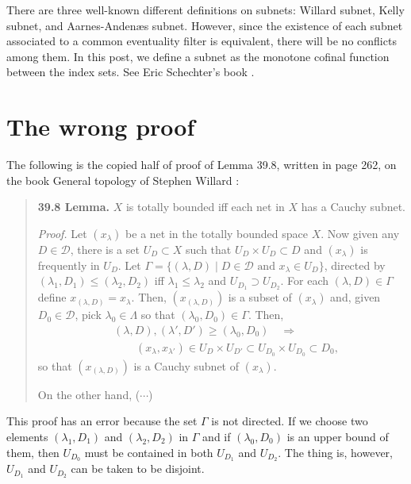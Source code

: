 \documentclass[11pt]{amsart}
\begin{document}
\begin{rmk}
There are three well-known different definitions on subnets: Willard subnet, Kelly subnet, and Aarnes-Andenæs subnet.
However, since the existence of each subnet associated to a common eventuality filter is equivalent, there will be no conflicts among them.
In this post, we define a subnet as the monotone cofinal function between the index sets.
See Eric Schechter's book \cite{schechter1996handbook}.
\end{rmk}

\section{The wrong proof}
The following is the copied half of proof of Lemma 39.8, written in page 262, on the book General topology of Stephen Willard \cite{willard2012general}:

\begin{quote}
\textbf{39.8 Lemma.}
$X$ is totally bounded iff each net in $X$ has a Cauchy subnet.

\textit{Proof.}
Let $(x_\lambda)$ be a net in the totally bounded space $X$.
Now given any $D\in\mathcal{D}$, there is a set $U_D\subset X$ such that $U_D\times U_D\subset D$ and $(x_\lambda)$ is frequently in $U_D$.
Let $\Gamma=\{(\lambda,D)\mid D\in\mathcal{D}\text{ and }x_\lambda\in U_D\}$, directed by $(\lambda_1,D_1)\le(\lambda_2,D_2)$ iff $\lambda_1\le\lambda_2$ and $U_{D_1}\supset U_{D_2}$.
For each $(\lambda,D)\in\Gamma$ define $x_{(\lambda,D)}=x_\lambda$.
Then, $(x_{(\lambda,D)})$ is a subset of $(x_\lambda)$ and, given $D_0\in\mathcal{D}$, pick $\lambda_0\in\Lambda$ so that $(\lambda_0,D_0)\in\Gamma$.
Then,
\begin{align*}
&(\lambda,D),(\lambda',D')\ge(\lambda_0,D_0)\quad\Rightarrow \\
&\qquad(x_\lambda,x_{\lambda'})\in U_D\times U_{D'}\subset U_{D_0}\times U_{D_0}\subset D_0,
\end{align*}
so that $(x_{(\lambda,D)})$ is a Cauchy subnet of $(x_\lambda)$.

On the other hand, ($\cdots$)
\end{quote}

This proof has an error because the set $\Gamma$ is not directed.
If we choose two elements $(\lambda_1,D_1)$ and $(\lambda_2,D_2)$ in $\Gamma$ and if $(\lambda_0,D_0)$ is an upper bound of them, then $U_{D_0}$ must be contained in both $U_{D_1}$ and $U_{D_2}$.
The thing is, however, $U_{D_1}$ and $U_{D_2}$ can be taken to be disjoint.
\end{document}
